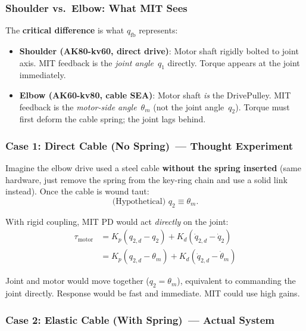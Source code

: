 \documentclass[11pt,a4paper]{article}
\begin{document}
\subsubsection{Shoulder vs.~Elbow: What MIT Sees}

The \textbf{critical difference} is what $q_{\mathrm{fb}}$ represents:

\begin{itemize}[leftmargin=2em]
  \item \textbf{Shoulder (AK80-kv60, direct drive)}: Motor shaft rigidly bolted to joint axis.
        MIT feedback is the \emph{joint angle}~$q_1$ directly.
        Torque appears at the joint immediately.
        \vspace{0.1em}

  \item \textbf{Elbow (AK60-kv80, cable SEA)}: Motor shaft \emph{is} the DrivePulley.
        MIT feedback is the \emph{motor-side angle}~$\theta_m$ (not the joint angle~$q_2$).
        Torque must first deform the cable spring; the joint lags behind.
\end{itemize}

\subsubsection{Case 1: Direct Cable (No Spring)~--- Thought Experiment}

Imagine the elbow drive used a steel cable \textbf{without the spring inserted}
(same hardware, just remove the spring from the key-ring chain and use a solid
link instead).  Once the cable is wound taut:
\begin{equation}
  \text{(Hypothetical) } q_2 \equiv \theta_m.
  \label{eq:rigid_drive}
\end{equation}

With rigid coupling, MIT PD would act \emph{directly} on the joint:
\begin{align}
  \tau_{\mathrm{motor}} &= K_p(q_{2,d} - q_2) + K_d(\dot{q}_{2,d} - \dot{q}_2)\\[0.3em]
  &= K_p(q_{2,d} - \theta_m) + K_d(\dot{q}_{2,d} - \dot{\theta}_m)
  \label{eq:rigid_mit}
\end{align}

Joint and motor would move together ($q_2 = \theta_m$), equivalent to commanding the
joint directly.  Response would be fast and immediate.  MIT could use high gains.

\subsubsection{Case 2: Elastic Cable (With Spring)~--- Actual System}
\end{document}
